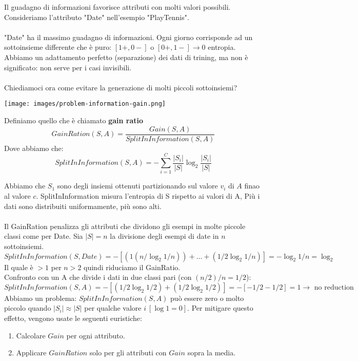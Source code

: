 \begin{minipage}{0.65\linewidth}
    Il guadagno di informazioni favorisce attributi con molti valori possibili. Consideriamo l'attributo "Date" nell'esempio "PlayTennis".\\\\
    "Date" ha il massimo guadagno di informazioni. Ogni giorno corrisponde ad un sottoinsieme differente che è puro: $[1+, 0-]$ o $[0+, 1-] \to 0$ entropia. 
    Abbiamo un adattamento perfetto (separazione) dei dati di trining, ma non è significato: non serve per i casi invisibili. \\\\
    Chiediamoci ora come evitare la generazione di molti piccoli
    sottoinsiemi?    
\end{minipage}
\hfill
\begin{minipage}{0.35\linewidth}
    \centering
    \texttt{[image: images/problem-information-gain.png]}
\end{minipage}
\begin{definition}
    Definiamo quello che è chiamato \textbf{gain ratio}
    $$GainRation(S, A) = \frac{Gain(S, A)}{SplitInInformation(S, A)}$$
    Dove abbiamo che:
    $$SplitInInformation(S, A) = -\sum_{i=1}^{C}\frac{|S_i|}{|S|} \log_2\frac{|S_i|}{|S|}$$
\end{definition}
\hspace{-15pt}Abbiamo che $S_1$ sono degli insiemi ottenuti partizionando sul valore $v_i$ di $A$ finao al valore $c$.
SplitInInformation misura l'entropia di S rispetto ai valori di A, Più i dati sono distribuiti uniformamente, più sono alti.\\\\
Il GainRation penalizza gli attributi che dividono gli esempi in molte piccole classi come per Date.
Sia $|S| = n$ la divisione degli esempi di date in $n$ sottoinsiemi.
$$SplitInInformation(S, Date) = -[(1(n/\log_2 1/n)) + \dots + (1/2 \log_2 1/n)] = -\log_2 1/n = \log_2$$
Il quale è $> 1$ per $n > 2$ quindi riduciamo il GainRatio.\\
Confronto con un A che divide i dati in due classi pari (con $(n/2)/n = 1/2$):
$$SplitInInformation(S, A) = -[(1/2 \log_2 1/2) + (1/2\log_2 1/2)] = -[-1/2 - 1/2] = 1 \to \text{ no reduction }$$
Abbiamo un problema: $SplitInInformation(S, A)$ può essere zero o molto piccolo quando $|S_i|\approx |S|$ per qualche valore $i \: [\log 1 = 0]$.
Per mitigare questo effetto, vengono usate le seguenti euristiche:
\begin{enumerate}
    \item Calcolare $Gain$ per ogni attributo.
    \item Applicare $GainRation$ solo per gli attributi con $Gain$ sopra la media.
\end{enumerate} 
